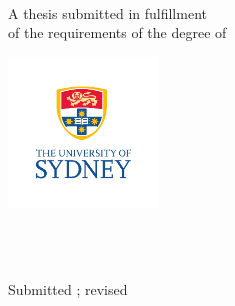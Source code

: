 
\thispagestyle{empty}

\begin{center}
  \begin{Huge}

  {\bf
    \ttitle \\
  }
  \end{Huge}

  \vfill

  \begin{large}
  {\bf
    \ifdefined\tdegrees
        \tname \enspace \tdegrees
    \else
        \tname
    \fi
  }
  \end{large}

  \vfill%

  A thesis submitted in fulfillment\\
  of the requirements of the degree of\\
  \tdegree{}

  \vspace{0.50cm}


  \includegraphics[width=4cm]{FrontMatter/Figures/USYD_Logo_Colour_Stacked.pdf}     %


  \vspace{0.50cm}

  {
      \tschool{}\\
      \tinstitution{}\\
  }
  \vspace{0.50cm}

  \begin{center}
    \ifdefined\tmonthAndYearRevised
        Submitted \tmonthAndYearSubmitted; revised \tmonthAndYearRevised
    \else
        \tmonthAndYearSubmitted
    \fi
  \end{center}


\end{center}
